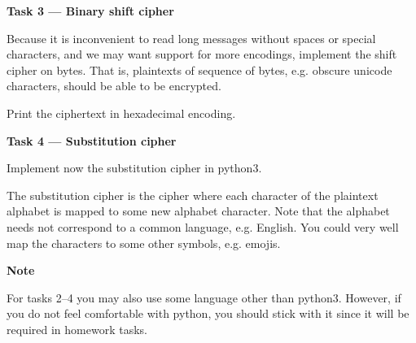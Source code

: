 \documentclass{practice}
\begin{document}
\textbf{Task 3 --- Binary shift cipher}

Because it is inconvenient to read long messages without spaces or special characters, and we may want support for more encodings, implement the shift cipher on bytes.
That is, plaintexts of sequence of bytes, e.g. obscure unicode characters, should be able to be encrypted.

Print the ciphertext in hexadecimal encoding.

\textbf{Task 4 --- Substitution cipher}

Implement now the substitution cipher in python3.

The substitution cipher is the cipher where each character of the plaintext alphabet is mapped to some new alphabet character.
Note that the alphabet needs not correspond to a common language, e.g. English.
You could very well map the characters to some other symbols, e.g. emojis.

\textbf{Note}

For tasks 2--4 you may also use some language other than python3.
However, if you do not feel comfortable with python, you should stick with it since it will be required in homework tasks.
\end{document}
